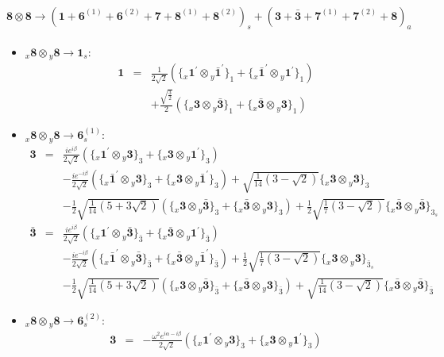 \documentclass[english]{article}
\newcommand{\rep}[1]{\mathbf{#1}}
\newcommand{\repx}[2]{{}_{#2}\mathbf{#1}}
\newcommand{\subcg}[3]{\big\{ \repx{#1}{x}\otimes\repx{#2}{y}\big\}^{}_{#3}}
\begin{document}
\paragraph*{\Large $\rep{8}\otimes\rep{8}\to\left(\rep{1}+\rep{6}^{(1)}+\rep{6}^{(2)}+\rep{7}+\rep{8}^{(1)}+\rep{8}^{(2)}\right)_s+\left(\rep{3}+\rep{\bar{3}}+\rep{7}^{(1)}+\rep{7}^{(2)}+\rep{8}\right)_a$}
\begin{itemize}
\item $\repx{8}{x}\otimes\repx{8}{y}\to\rep{1}_{s}$:
\begin{eqnarray*}
\rep{1} &=& \frac{1}{2 \sqrt{2}}\left(\subcg{1^{\prime}}{\bar{1}^{\prime}}{1}+\subcg{\bar{1}^{\prime}}{1^{\prime}}{1}\right) \\ 
 & & +\frac{\sqrt{\frac{3}{2}}}{2}\left(\subcg{3}{\bar{3}}{1}+\subcg{\bar{3}}{3}{1}\right)
\end{eqnarray*}
\item $\repx{8}{x}\otimes\repx{8}{y}\to\rep{6}_{s}^{(1)}$:
\begin{eqnarray*}
\rep{3} &=& \frac{i e^{i \beta }}{2 \sqrt{2}}\left(\subcg{1^{\prime}}{3}{3}+\subcg{3}{1^{\prime}}{3}\right) \\ 
 & & -\frac{i e^{-i \beta }}{2 \sqrt{2}}\left(\subcg{\bar{1}^{\prime}}{3}{3}+\subcg{3}{\bar{1}^{\prime}}{3}\right)+\sqrt{\frac{1}{14} \left(3-\sqrt{2}\right)}\subcg{3}{3}{3} \\ 
 & & -\frac{1}{2} \sqrt{\frac{1}{14} \left(5+3 \sqrt{2}\right)}\left(\subcg{3}{\bar{3}}{3}+\subcg{\bar{3}}{3}{3}\right)+\frac{1}{2} \sqrt{\frac{1}{7} \left(3-\sqrt{2}\right)}\subcg{\bar{3}}{\bar{3}}{3_{s}}
\\
\rep{\bar{3}} &=& \frac{i e^{i \beta }}{2 \sqrt{2}}\left(\subcg{1^{\prime}}{\bar{3}}{\bar{3}}+\subcg{\bar{3}}{1^{\prime}}{\bar{3}}\right) \\ 
 & & -\frac{i e^{-i \beta }}{2 \sqrt{2}}\left(\subcg{\bar{1}^{\prime}}{\bar{3}}{\bar{3}}+\subcg{\bar{3}}{\bar{1}^{\prime}}{\bar{3}}\right)+\frac{1}{2} \sqrt{\frac{1}{7} \left(3-\sqrt{2}\right)}\subcg{3}{3}{\bar{3}_{s}} \\ 
 & & -\frac{1}{2} \sqrt{\frac{1}{14} \left(5+3 \sqrt{2}\right)}\left(\subcg{3}{\bar{3}}{\bar{3}}+\subcg{\bar{3}}{3}{\bar{3}}\right)+\sqrt{\frac{1}{14} \left(3-\sqrt{2}\right)}\subcg{\bar{3}}{\bar{3}}{\bar{3}}
\end{eqnarray*}
\item $\repx{8}{x}\otimes\repx{8}{y}\to\rep{6}_{s}^{(2)}$:
\begin{eqnarray*}
\rep{3} &=& -\frac{\omega ^2 e^{i \alpha -i \beta }}{2 \sqrt{2}}\left(\subcg{1^{\prime}}{3}{3}+\subcg{3}{1^{\prime}}{3}\right) \\ 

\end{eqnarray*}
\end{itemize}
\end{document}
